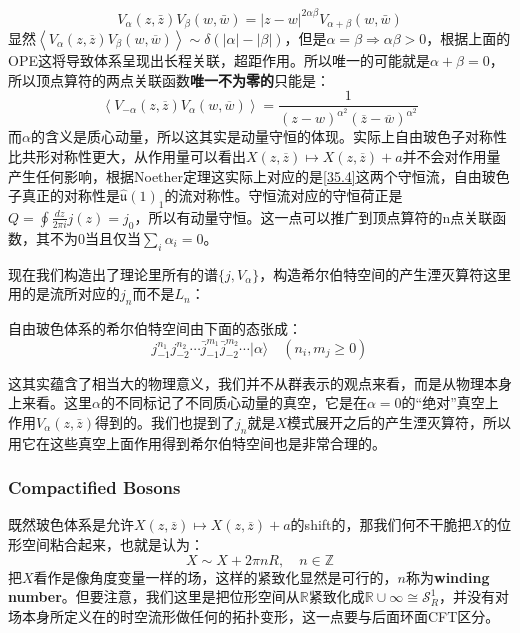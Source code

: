 \begin{equation}
	V_\alpha(z,\bar z)V_\beta(w,\bar w)=|z-w|^{2\alpha\beta}V_{\alpha+\beta}(w,\bar w)
\end{equation}
显然$\left\langle V_{\alpha}(z,\overline{z})V_{\beta}(w,\overline{w})\right\rangle \sim\delta(|\alpha|-|\beta|)$，但是$\alpha=\beta\Rightarrow\alpha\beta>0$，根据上面的OPE这将导致体系呈现出长程关联，超距作用。所以唯一的可能就是$\alpha+\beta=0$，所以顶点算符的两点关联函数\textbf{唯一不为零的}只能是：
\begin{equation}
	\left\langle V_{-\alpha}(z,\overline{z})V_{\alpha}(w,\overline{w})\right\rangle=\frac1{(z-w)^{\alpha^2}(\overline{z}-\overline{w})^{\alpha^2}}
\end{equation}
而$\alpha$的含义是质心动量，所以这其实是动量守恒的体现。实际上自由玻色子对称性比共形对称性更大，从作用量可以看出$X(z,\overline{z})\mapsto X(z,\overline{z})+a$并不会对作用量产生任何影响，根据Noether定理这实际上对应的是\ref{35.4}这两个守恒流，自由玻色子真正的对称性是$\hat{\mathfrak{u}}(1)_1$的流对称性。守恒流对应的守恒荷正是$Q=\oint\frac{dz}{2\pi i}j(z)=j_{0}$，所以有动量守恒。这一点可以推广到顶点算符的n点关联函数，其不为0当且仅当$\sum_i \alpha_i=0$。

现在我们构造出了理论里所有的谱$\{j,V_\alpha\}$，构造希尔伯特空间的产生湮灭算符这里用的是流所对应的$j_n$而不是$L_n$：
\begin{theorem}
	自由玻色体系的希尔伯特空间由下面的态张成：
	\begin{equation}
		j_{-1}^{n_1}j_{-2}^{n_2}\cdots\bar{j}_{-1}^{m_1}\bar{j}_{-2}^{m_2}\cdots|\alpha\rangle\quad(n_i,m_j\geq0)
	\end{equation}
\end{theorem}
这其实蕴含了相当大的物理意义，我们并不从群表示的观点来看，而是从物理本身上来看。这里$\alpha$的不同标记了不同质心动量的真空，它是在$\alpha=0$的“绝对”真空上作用$V_\alpha(z,\bar z)$得到的。我们也提到了$j_n$就是$X$模式展开之后的产生湮灭算符，所以用它在这些真空上面作用得到希尔伯特空间也是非常合理的。
\subsubsection{Compactified Bosons}
既然玻色体系是允许$X(z,\overline{z})\mapsto X(z,\overline{z})+a$的shift的，那我们何不干脆把$X$的位形空间粘合起来，也就是认为：
\begin{equation}
	X\sim X+2\pi nR,\quad n\in\mathbb{Z}
\end{equation}
把$X$看作是像角度变量一样的场，这样的紧致化显然是可行的，$n$称为\textbf{winding number}。但要注意，我们这里是把位形空间从$\mathbb{R}$紧致化成$\mathbb{R}\cup\infty\cong\mathcal{S}^1_R$，并没有对场本身所定义在的时空流形做任何的拓扑变形，这一点要与后面环面CFT区分。

